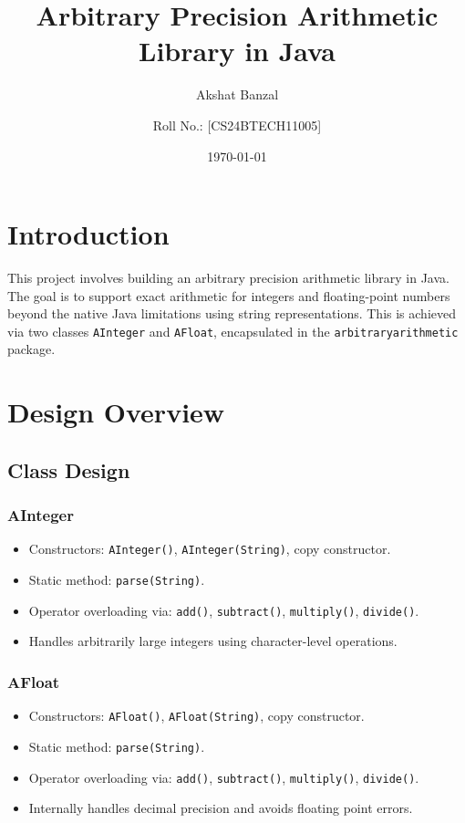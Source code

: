 \documentclass[12pt]{article}
\title{Arbitrary Precision Arithmetic Library in Java}
\author{Akshat Banzal \and Roll No.: [CS24BTECH11005]}
\date{\today}
\begin{document}
\maketitle

\tableofcontents

\newpage

\section{Introduction}
This project involves building an arbitrary precision arithmetic library in Java. The goal is to support exact arithmetic for integers and floating-point numbers beyond the native Java limitations using string representations. This is achieved via two classes \texttt{AInteger} and \texttt{AFloat}, encapsulated in the \texttt{arbitraryarithmetic} package.

\section{Design Overview}

\subsection{Class Design}
\subsubsection{AInteger}
\begin{itemize}
  \item Constructors: \texttt{AInteger()}, \texttt{AInteger(String)}, copy constructor.
  \item Static method: \texttt{parse(String)}.
  \item Operator overloading via: \texttt{add()}, \texttt{subtract()}, \texttt{multiply()}, \texttt{divide()}.
  \item Handles arbitrarily large integers using character-level operations.
\end{itemize}

\subsubsection{AFloat}
\begin{itemize}
  \item Constructors: \texttt{AFloat()}, \texttt{AFloat(String)}, copy constructor.
  \item Static method: \texttt{parse(String)}.
  \item Operator overloading via: \texttt{add()}, \texttt{subtract()}, \texttt{multiply()}, \texttt{divide()}.
  \item Internally handles decimal precision and avoids floating point errors.
\end{itemize}
\end{document}
